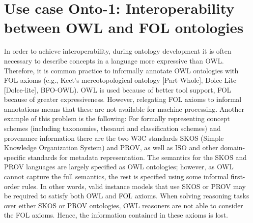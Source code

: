 \documentclass[10pt,fleqn,%
\ifpretendfinal
final%
\else
draft%
\fi,
]{scrreprt}
\begin{document}
%
%
%
%
%
%

\section{Use case Onto-1: Interoperability between OWL and FOL ontologies}

In order to achieve interoperability, during ontology development it is often necessary to describe 
concepts in a language more expressive than OWL.  Therefore, it is common practice to informally 
annotate OWL ontologies with FOL axioms (e.g., Keet's mereotopological ontology [Part-Whole], 
Dolce Lite [Dolce-lite], BFO-OWL). OWL is used because of better tool support, FOL because of 
greater expressiveness. However, relegating FOL axioms to  informal annotations means that these 
are not available for machine processing.  Another example of this problem is the following: For 
formally representing concept schemes (including taxonomies, thesauri and classification schemes) 
and provenance information there are the two W3C standards SKOS (Simple Knowledge Organization 
System) and PROV, as well as ISO and other domain-specific  standards for 
metadata representation. The semantics for the SKOS and PROV languages are largely specified as OWL 
ontologies; however, as OWL cannot capture the full semantics, the rest is specified using some 
informal first-order rules. In other words, valid instance models that use SKOS or PROV may be 
required to satisfy both OWL and FOL axioms. When solving reasoning tasks over either SKOS or PROV 
ontologies, OWL reasoners are not able to consider the  FOL axioms. Hence, the information 
contained in these axioms is lost.
\end{document}
